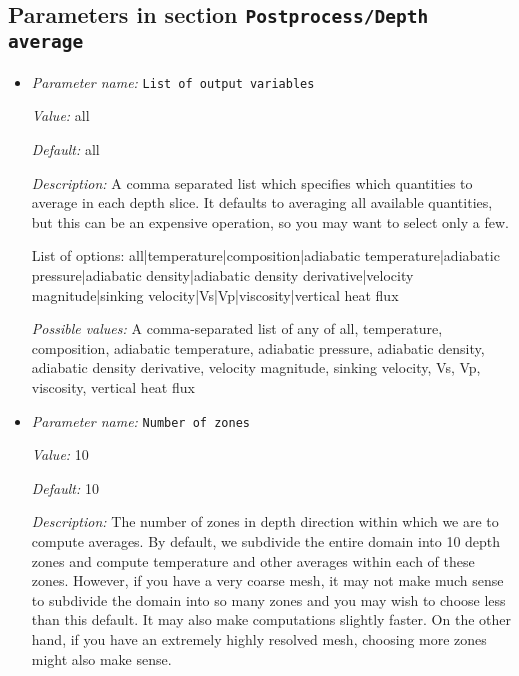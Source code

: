 \subsection{Parameters in section \tt Postprocess/Depth average}
\label{parameters:Postprocess/Depth_20average}

\begin{itemize}
\item {\it Parameter name:} {\tt List of output variables}
\label{parameters:Postprocess/Depth average/List of output variables}
\label{parameters:Postprocess/Depth_20average/List_20of_20output_20variables}


{\it Value:} all


{\it Default:} all


{\it Description:} A comma separated list which specifies which quantities to average in each depth slice. It defaults to averaging all available quantities, but this can be an expensive operation, so you may want to select only a few.

List of options:
all|temperature|composition|adiabatic temperature|adiabatic pressure|adiabatic density|adiabatic density derivative|velocity magnitude|sinking velocity|Vs|Vp|viscosity|vertical heat flux


{\it Possible values:} A comma-separated list of any of all, temperature, composition, adiabatic temperature, adiabatic pressure, adiabatic density, adiabatic density derivative, velocity magnitude, sinking velocity, Vs, Vp, viscosity, vertical heat flux
\item {\it Parameter name:} {\tt Number of zones}
\label{parameters:Postprocess/Depth average/Number of zones}
\label{parameters:Postprocess/Depth_20average/Number_20of_20zones}


{\it Value:} 10


{\it Default:} 10


{\it Description:} The number of zones in depth direction within which we are to compute averages. By default, we subdivide the entire domain into 10 depth zones and compute temperature and other averages within each of these zones. However, if you have a very coarse mesh, it may not make much sense to subdivide the domain into so many zones and you may wish to choose less than this default. It may also make computations slightly faster. On the other hand, if you have an extremely highly resolved mesh, choosing more zones might also make sense.



\end{itemize}
